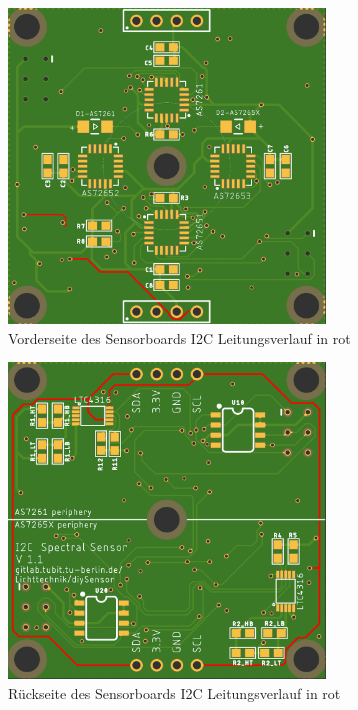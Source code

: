 \begin{figure}[H]
\centering
\includegraphics[width=0.75\textwidth]{img/Sensor-platiene_front}
\caption{Vorderseite des Sensorboards I2C Leitungsverlauf in rot}
\label{fig:Sensor-platiene_front}
\end{figure}

\begin{figure}[H]
\centering
\includegraphics[width=0.75\textwidth]{img/Sensor-platiene_back}
\caption{Rückseite des Sensorboards I2C Leitungsverlauf in rot}
\label{fig:Sensor-platiene_back}
\end{figure}

